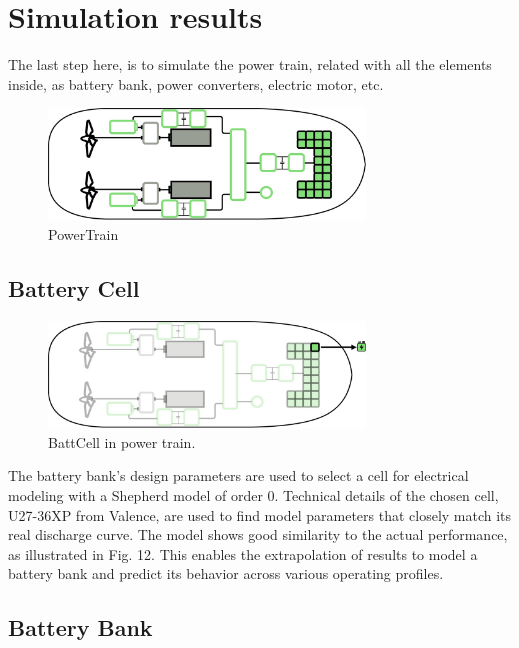 \chapter{Simulation results}

The last step here, is to simulate the power train, related with all the elements inside, as battery bank, power converters, electric motor, etc.

\begin{figure}[h]
    \centering
    \includegraphics[width=0.75\textwidth]{images/chapter05/PowerTrain.jpg}
    \caption{PowerTrain}
    \label{PowerTrain}
\end{figure}

\section{Battery Cell}

\begin{figure}[h]
    \centering
    \includegraphics[width=0.75\textwidth]{images/chapter05/BattCell_scheme.jpg}
    \caption{BattCell in power train.}
    \label{BattCell}
\end{figure}

The battery bank’s design parameters are used to select a cell for electrical modeling with a Shepherd model of order 0. Technical details of the chosen cell, U27-36XP from Valence, are used to find model parameters that closely match its real discharge curve. The model shows good similarity to the actual performance, as illustrated in Fig. 12. This enables the extrapolation of results to model a battery bank and predict its behavior across various operating profiles.




\section{Battery Bank}

